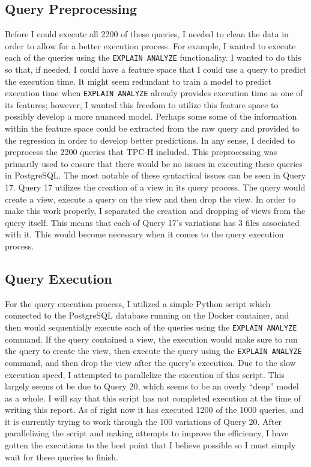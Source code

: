 \documentclass[sigconf]{acmart}
\begin{document}
\subsection{Query Preprocessing}
Before I could execute all 2200 of these queries, I needed to clean the data in order to allow for a better execution process.
For example, I wanted to execute each of the queries using the \texttt{EXPLAIN ANALYZE} functionality. I wanted to do this so that,
if needed, I could have a feature space that I could use a query to predict the execution time. It might seem redundant to train a model to predict execution time when
\texttt{EXPLAIN ANALYZE} already provides execution time as one of its features; however, I wanted this freedom to utilize this feature space to
possibly develop a more nuanced model. Perhaps some some of the information within the feature space could be extracted from the raw query and provided to the regression
in order to develop better predictions. In any sense, I decided to preprocess the 2200 queries that TPC-H included. This preprocessing was primarily used to ensure that
there would be no issues in executing these queries in PostgreSQL. The most notable of these syntactical issues can be seen in Query 17. Query 17 utilizes the creation of a
view in its query process. The query would create a view, execute a query on the view and then drop the view. In order to make this work properly, I separated the creation and dropping
of views from the query itself. This means that each of Query 17's variations has 3 files associated with it. This would become necessary when it comes to the query execution process.


\subsection{Query Execution}
For the query execution process, I utilized a simple Python script which connected to the PostgreSQL database running on the Docker container, and then would sequentially execute each of the queries
using the \texttt{EXPLAIN ANALYZE} command. If the query contained a view, the execution would make sure to run the query to create the view, then execute the query using the \texttt{EXPLAIN ANALYZE}
command, and then drop the view after the query's execution. Due to the slow execution speed, I attempted to parallelize the execution of this script. This largely seems ot be due to Query 20, which 
seems to be an overly ``deep'' model as a whole. I will say that this script has not completed execution at the time of writing this report. As of right now it has executed 1200 of the 1000 queries, and it
is currently trying to work through the 100 variations of Query 20. After parallelizing the script and making attempts to 
improve the efficiency, I have gotten the executions to the best point that I believe possible so I must simply wait for these queries to finish.
\end{document}
